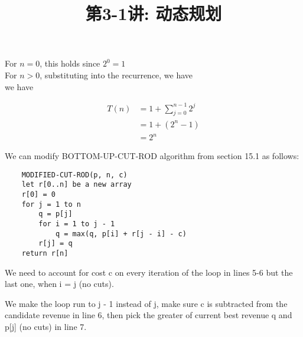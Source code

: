 \documentclass[a4paper, justified]{tufte-handout}
\title{第3-1讲: 动态规划}
\date{\zhtoday} %
\begin{document}
\maketitle
\noplagiarism %
\begin{abstract}
\end{abstract}
\beginrequired

\begin{problem}[TC 15.1-1]
\end{problem}

\begin{solution}
  For $n=0$, this holds since $2^0 = 1$\\
  For $n>0$, substituting into the recurrence, we have\\
  we have

  $$
    \begin{aligned}
      T(n) & =1+\sum_{j=0}^{n-1} 2^j \\
           & =1+\left(2^n-1\right)   \\
           & =2^n
    \end{aligned}
  $$




\end{solution}

\begin{problem}[TC 15.1-3]
\end{problem}

\begin{solution}
  We can modify BOTTOM-UP-CUT-ROD algorithm from section 15.1 as follows:\\
  \begin{verbatim}
    MODIFIED-CUT-ROD(p, n, c)
    let r[0..n] be a new array
    r[0] = 0
    for j = 1 to n
        q = p[j]
        for i = 1 to j - 1
            q = max(q, p[i] + r[j - i] - c)
        r[j] = q
    return r[n]

\end{verbatim}
  We need to account for cost c on every iteration of the loop in lines 5-6 but the last one, when i = j (no cuts).

  We make the loop run to j - 1 instead of j, make sure c is subtracted from the candidate revenue in line 6, then pick the greater of current best revenue q and p[j] (no cuts) in line 7.


\end{solution}
\end{document}
